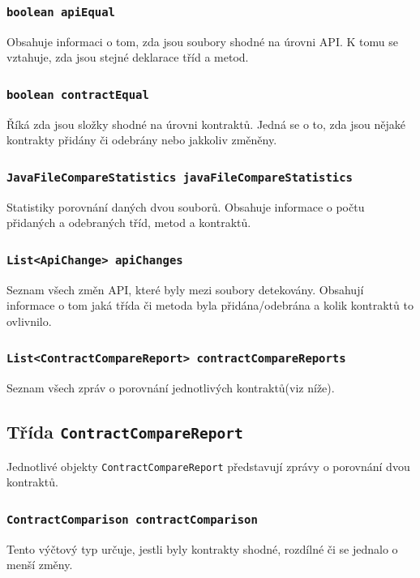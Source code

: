 			\subsubsection{\texttt{boolean apiEqual}}
				Obsahuje informaci o tom, zda jsou soubory shodné na úrovni API. K tomu se vztahuje, zda jsou stejné deklarace tříd a metod.
				
			\subsubsection{\texttt{boolean contractEqual}}
				Říká zda jsou složky shodné na úrovni kontraktů. Jedná se o to, zda jsou nějaké kontrakty přidány či odebrány nebo jakkoliv změněny.
				
			\subsubsection{\texttt{JavaFileCompareStatistics javaFileCompareStatistics}}
				Statistiky porovnání daných dvou souborů. Obsahuje informace o počtu přidaných a odebraných tříd, metod a kontraktů.
				
			\subsubsection{\texttt{List<ApiChange> apiChanges}}
				Seznam všech změn API, které byly mezi soubory detekovány. Obsahují informace o tom jaká třída či metoda byla přidána/odebrána a kolik kontraktů to ovlivnilo.
				
			\subsubsection{\texttt{List<ContractCompareReport> contractCompareReports}}
				Seznam všech zpráv o porovnání jednotlivých kontraktů(viz níže).
			
				
		\subsection{Třída \texttt{ContractCompareReport}}
			Jednotlivé objekty \texttt{ContractCompareReport} představují zprávy o porovnání dvou kontraktů.
			
			\subsubsection{\texttt{ContractComparison contractComparison}}
				Tento výčtový typ určuje, jestli byly kontrakty shodné, rozdílné či se jednalo o menší změny.
				
